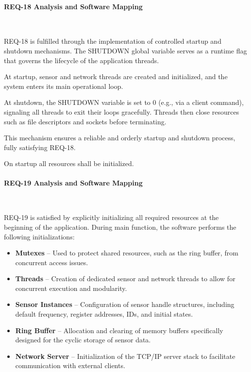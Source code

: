 \paragraph{REQ-18 Analysis and Software Mapping}\

REQ-18 is fulfilled through the implementation of controlled startup and shutdown 
mechanisms. The SHUTDOWN global variable serves as a runtime flag that governs the 
lifecycle of the application threads.

At startup, sensor and network threads are created and initialized, and the system 
enters its main operational loop.

At shutdown, the SHUTDOWN variable is set to 0 (e.g., via a client command), 
signaling all threads to exit their loops gracefully. Threads then close resources 
such as file descriptors and sockets before terminating.

This mechanism ensures a reliable and orderly startup and shutdown process, fully 
satisfying REQ-18.


\begin{tcolorbox}[
    title=REQ-19,
    colback=gray!5,
    colframe=black,
    fonttitle=\bfseries
]
On startup all resources shall be initialized.
\end{tcolorbox}

\paragraph{REQ-19 Analysis and Software Mapping}\

REQ-19 is satisfied by explicitly initializing all required resources at the 
beginning of the application. During main function, the software performs the following 
initializations:

\begin{itemize}
    \item \textbf{Mutexes} -- Used to protect shared resources, such as the ring buffer, from concurrent access issues.
    \item \textbf{Threads} -- Creation of dedicated sensor and network threads to allow for concurrent execution and modularity.
    \item \textbf{Sensor Instances} -- Configuration of sensor handle structures, including default frequency, register addresses, IDs, and initial states.
    \item \textbf{Ring Buffer} -- Allocation and clearing of memory buffers specifically designed for the cyclic storage of sensor data.
    \item \textbf{Network Server} -- Initialization of the TCP/IP server stack to facilitate communication with external clients.
\end{itemize}

